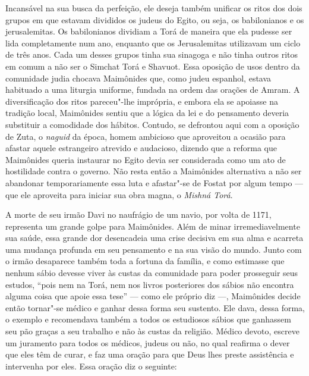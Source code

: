 Incansável na sua busca da perfeição, ele deseja também unificar os
ritos dos dois grupos em que estavam divididos os judeus do Egito, ou
seja, os babilonianos e os jerusalemitas. Os babilonianos dividiam a
Torá de maneira que ela pudesse ser lida completamente num ano,
enquanto que os Jerusalemitas utilizavam um ciclo de três anos. Cada um
desses grupos tinha sua sinagoga e não tinha outros ritos em comum a
não ser o Simchat Torá e Shavuot. Essa oposição de usos dentro da
comunidade judia chocava Maimônides que, como judeu espanhol, estava
habituado a uma liturgia uniforme, fundada na ordem das orações de
Amram. A diversificação dos ritos pareceu"-lhe imprópria, e embora ela se
apoiasse na tradição local, Maimônides sentiu que a lógica da lei e do
pensamento deveria substituir a comodidade dos hábitos. Contudo, se
defrontou aqui com a oposição de Zuta, o \emph{naguid} da época, homem
ambicioso que aproveitou a ocasião para afastar aquele estrangeiro
atrevido e audacioso, dizendo que a reforma que Maimônides queria
instaurar no Egito devia ser considerada como um ato de hostilidade
contra o governo. Não resta então a Maimônides alternativa a não ser
abandonar temporariamente essa luta e afastar"-se de Fostat por algum
tempo --- que ele aproveita para iniciar sua obra magna, o
\emph{Mishná Torá}.

A morte de seu irmão Davi no naufrágio de um navio, por volta de 1171,
representa um grande golpe para Maimônides. Além de minar
irremediavelmente sua saúde, essa grande dor desencadeia uma crise
decisiva em sua alma e acarreta uma mudança profunda em seu pensamento
e na sua visão do mundo. Junto com o irmão desaparece também
toda a fortuna da família, e
como estimasse que nenhum sábio devesse viver às custas da comunidade
para poder prosseguir seus estudos, ``pois nem na Torá, nem nos
livros posteriores dos sábios não encontra alguma coisa que apoie essa
tese'' --- como ele próprio diz ---, Maimônides decide então tornar"-se
médico e ganhar dessa forma seu sustento. Ele dava, dessa forma, o
exemplo e recomendava também a todos os estudiosos sábios que ganhassem
seu pão graças a seu trabalho e não às custas da religião. Médico
devoto, escreve um juramento para todos os médicos, judeus ou não, no
qual reafirma o dever que eles têm de curar, e faz uma oração para que
Deus lhes preste assistência e intervenha por eles. Essa oração diz o
seguinte:

